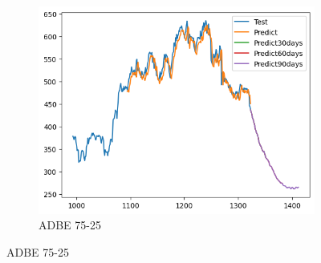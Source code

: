 \documentclass{ieeeojies}
\begin{document}
\begin{figure}[H]
\begin{subfigure}[h]{0.33\linewidth}
        \label{fig:adbe-8-2}
    \end{subfigure}%
    \hfill
    \begin{subfigure}[h]{0.33\linewidth}
        \centering
        \includegraphics[width=\linewidth]{RNN Plot/RNN_ADBE_75_25.png}
        \caption{ADBE 75-25}
        \label{fig:adbe-75-25}
    \end{subfigure}
    \vspace{10pt}
\end{figure}
 \vspace{-20pt}
\end{document}
